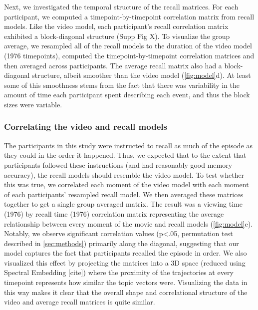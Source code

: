 \documentclass{article}
\begin{document}
{Next, we investigated the temporal structure of the recall matrices. For each participant, we computed a timepoint-by-timepoint correlation matrix from recall models. Like the video model, each participant's recall correlation matrix exhibited a block-diagonal structure (Supp Fig X). To visualize the group average, we resampled all of the recall models to the duration of the video model (1976 timepoints), computed the timepoint-by-timepoint correlation matrices and then averaged across participants.  The average recall matrix also had a block-diagonal structure, albeit smoother than the video model (\ref{fig:model}d).  At least some of this smoothness stems from the fact that there was variability in the amount of time each participant spent describing each event, and thus the block sizes were variable.

\subsubsection{Correlating the video and recall models}
The participants in this study were instructed to recall as much of the episode as they could in the order it happened.  Thus, we expected that to the extent that participants followed these instructions (and had reasonably good memory accuracy), the recall models should resemble the video model. To test whether this was true, we correlated each moment of the video model with each moment of each participants' resampled recall model. We then averaged these matrices together to get a single group averaged matrix.  The result was a viewing time (1976) by recall time (1976) correlation matrix representing the average relationship between every moment of the movie and recall models (\ref{fig:model}e). Notably, we observe significant correlation values (p<.05, permutation test described in \ref{sec:methods}) primarily along the diagonal, suggesting that our model captures the fact that participants recalled the episode in order. We also visualized this effect by projecting the matrices into a 3D space (reduced using Spectral Embedding [cite]) where the proximity of the trajectories at every timepoint represents how similar the topic vectors were. Visualizing the data in this way makes it clear that the overall shape and correlational structure of the video and average recall matrices is quite similar.

}
\end{document}

